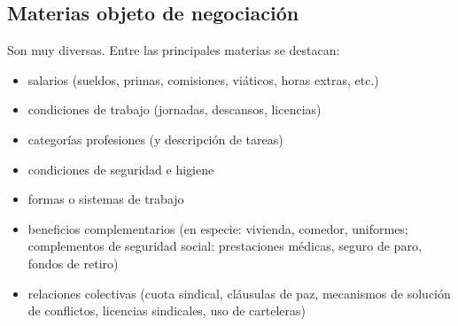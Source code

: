 \documentclass[spanish,12pt,a4paper,titlepage]{report}
\begin{document}
\subsection{Materias objeto de negociación}
Son muy diversas. Entre las principales materias se destacan:
\begin{itemize}
\item salarios (sueldos, primas, comisiones, viáticos, horas extras, etc.)
\item condiciones de trabajo (jornadas, descansos, licencias)
\item categorías profesiones (y descripción de tareas)
\item condiciones de seguridad e higiene
\item formas o sistemas de trabajo
\item beneficios complementarios (en especie: vivienda, comedor, uniformes; complementos de seguridad social: prestaciones médicas, seguro de paro, fondos de retiro)
\item relaciones colectivas (cuota sindical, cláusulas de paz, mecanismos de solución de conflictos, licencias sindicales, uso de carteleras)
\end{itemize}
\end{document}
